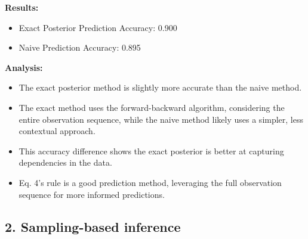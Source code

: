 \documentclass[a4 paper]{article}
\begin{document}
\begin{enumerate}
    \textbf{Results:}
    \begin{itemize}
        \item Exact Posterior Prediction Accuracy: 0.900
        \item Naive Prediction Accuracy: 0.895
    \end{itemize}
    
    \textbf{Analysis:}
    \begin{itemize}
        \item The exact posterior method is slightly more accurate than the naive method.
        \item The exact method uses the forward-backward algorithm, considering the entire observation sequence, 
            while the naive method likely uses a simpler, less contextual approach.
        \item This accuracy difference shows the exact posterior is better at capturing dependencies in the data.
        \item Eq. 4's rule is a good prediction method, leveraging the full observation sequence for more informed predictions.
    \end{itemize}

\end{enumerate}

\subsection*{2. Sampling-based inference}
\end{document}
